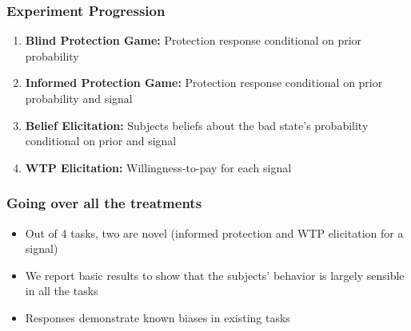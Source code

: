 \documentclass[11pt,hyperref={bookmarks=false}]{beamer}
\begin{document}
\begin{frame}
\frametitle{Experiment Progression}
\begin{enumerate}
\item \textbf{Blind Protection Game:} Protection response conditional on prior probability
\item \textbf{Informed Protection Game:} Protection response conditional on prior probability and signal
\item \textbf{Belief Elicitation:} Subjects beliefs about the bad state's probability conditional on prior and signal
\item \textbf{WTP Elicitation:} Willingness-to-pay for each signal
\end{enumerate}
\end{frame}


\begin{frame}
\frametitle{Going over all the treatments}
\begin{itemize}
\item Out of 4 tasks, two are novel (informed protection and WTP elicitation for a signal)
\item We report basic results to show that the subjects' behavior is largely sensible in all the tasks
\item Responses demonstrate known biases in existing tasks
\end{itemize}
\end{frame}
\end{document}
